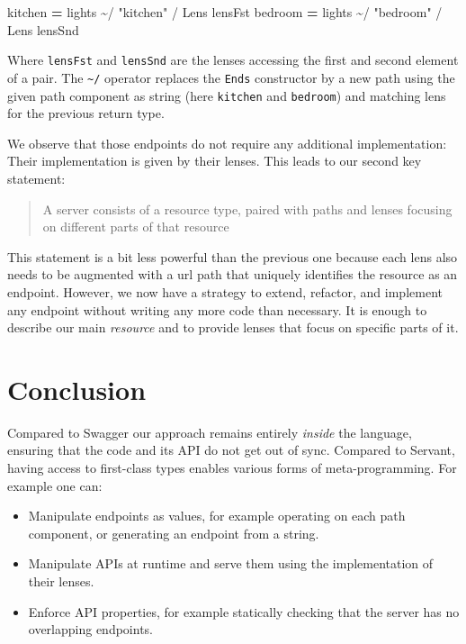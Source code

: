 \documentclass[sigplan,screen,review, nonacm]{acmart}
\newenvironment{Shaded}{}{}
\newcommand{\FunctionTok}[1]{\textcolor[rgb]{0.02,0.16,0.49}{#1}}
\newcommand{\KeywordTok}[1]{\textcolor[rgb]{0.00,0.44,0.13}{\textbf{#1}}}
\newcommand{\NormalTok}[1]{#1}
\newcommand{\OperatorTok}[1]{\textcolor[rgb]{0.40,0.40,0.40}{#1}}
\newcommand{\OtherTok}[1]{\textcolor[rgb]{0.00,0.44,0.13}{#1}}
\newcommand{\StringTok}[1]{\textcolor[rgb]{0.25,0.44,0.63}{#1}}
\begin{document}
\begin{Shaded}
\begin{Highlighting}[]
\FunctionTok{kitchen }\KeywordTok{=}\NormalTok{ lights }\OperatorTok{\textasciitilde{}/} \StringTok{"kitchen"} \OperatorTok{/} \OtherTok{Lens}\NormalTok{ lensFst}
\FunctionTok{bedroom }\KeywordTok{=}\NormalTok{ lights }\OperatorTok{\textasciitilde{}/} \StringTok{"bedroom"} \OperatorTok{/} \OtherTok{Lens}\NormalTok{ lensSnd}
\end{Highlighting}
\end{Shaded}

Where \texttt{lensFst} and \texttt{lensSnd} are the lenses accessing the
first and second element of a pair. The \texttt{\OperatorTok{\textasciitilde{}/}} operator
replaces the \texttt{\OtherTok{Ends}} constructor by a new path using the given
path component as string (here \texttt{kitchen} and \texttt{bedroom}) and matching lens for
the previous return type.

We observe that those endpoints do not
require any additional implementation: Their implementation is given by
their lenses. This leads to our second key statement:

\begin{quote}
A server consists of a resource type, paired with paths and lenses focusing on different parts of that resource
\end{quote}

This statement is a bit less powerful than the previous one because each
lens also needs to be augmented with a url path that uniquely
identifies the resource as an endpoint. However, we now have a strategy to extend, refactor, and implement
any endpoint without writing any more code than necessary. It is enough to
describe our main \emph{resource} and to provide lenses that focus on specific
parts of it.

\section{Conclusion}

Compared to Swagger our approach remains entirely \emph{inside} the language, ensuring
that the code and its API do not get out of sync. Compared to Servant, having access
to first-class types enables various forms of meta-programming. For example one can:
\begin{itemize}
  \item Manipulate endpoints as values, for example operating on each path component, or generating
    an endpoint from a string.
  \item Manipulate APIs at runtime and serve them using the implementation of their lenses.
  \item Enforce API properties, for example statically checking that the server has no overlapping
    endpoints.
\end{itemize}
\end{document}
